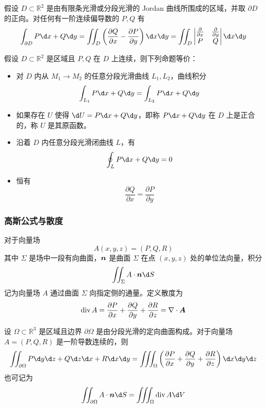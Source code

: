 \begin{theorem}[Green 公式]
	假设 $D \subset \mathbb{R}^2$ 是由有限条光滑或分段光滑的 Jordan 曲线所围成的区域，并取 $\partial D$ 的正向。对任何有一阶连续偏导数的 $P, Q$ 有
	\[ \int_{\partial D} P \d x + Q \d y = \iint_{D} \left( \frac{\partial Q}{\partial x} - \frac{\partial P}{\partial y} \right) \d x \d y = \iint_{D} \left| \begin{matrix}
			\frac{\partial}{\partial x} & \frac{\partial}{\partial y} \\
			P                           & Q
		\end{matrix} \right| \d x \d y \]
\end{theorem}

\begin{theorem}[Green 定理]
	假设 $D \subset \mathbb{R}^2$ 是区域且 $P, Q$ 在 $D$ 上连续，则下列命题等价：

	\begin{itemize}
		\item 对 $D$ 内从 $M_1 \to M_2$ 的任意分段光滑曲线 $L_1, L_2$，曲线积分
		      \[ \int_{L_1} P \d x + Q \d y = \int_{L_2} P \d x + Q \d y \]
		\item 如果存在 $U$ 使得 $\d U = P \d x + Q \d y$，即称 $P \d x + Q \d y$ 在 $D$ 上是正合的，称 $U$ 是其原函数。
		\item 沿着 $D$ 内任意分段光滑闭曲线 $L$，有
		      \[ \oint_{L} P \d x + Q \d y = 0 \]
		\item 恒有
		      \[ \frac{\partial Q}{\partial x} = \frac{\partial P}{\partial y} \]
	\end{itemize}
\end{theorem}

\subsubsection*{高斯公式与散度}

对于向量场
\[ A(x, y, z) = (P, Q, R) \]
其中 $\Sigma$ 是场中一段有向曲面，$\boldsymbol{n}$ 是曲面 $\Sigma$ 在点 $(x, y, z)$ 处的单位法向量，积分
\[ \iint_{\Sigma} A \cdot \vbf{n} \d S  \]
记为向量场 $A$ 通过曲面 $\Sigma$ 向指定侧的通量。定义散度为
\[ \operatorname{div} A = \frac{\partial P}{\partial x} + \frac{\partial Q}{\partial y} + \frac{\partial R}{\partial z} = \nabla \cdot \boldsymbol{A} \]

\begin{theorem}[Gauss 公式]
	设 $\Omega \subset \mathbb{R}^3$ 是区域且边界 $\partial \Omega$ 是由分段光滑的定向曲面构成。对于向量场 $A = (P, Q, R)$ 是一阶导数连续的，则
	\[ \iint_{\partial \Omega} P \d y \d z + Q \d z \d x + R \d x \d y = \iiint_{\Omega} \left( \frac{\partial P}{\partial x} + \frac{\partial Q}{\partial y} + \frac{\partial R}{\partial z} \right) \d x \d y \d z \]
	也可记为
	\[ \iint_{\partial \Omega} A \cdot \vbf{n} \d S = \iiint_{\Omega} \operatorname{div} A \d V \]
\end{theorem}


